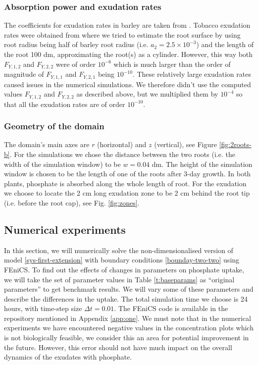 \documentclass[11pt]{article}
\numberwithin{equation}{section}
\begin{document}
\subsubsection{Absorption power and exudation rates}
The coefficients for exudation rates in barley are taken from \cite{Ruiz-2020}. Tobacco exudation rates were obtained from \cite{giles_george} where we tried to estimate the root surface by using root radius being half of barley root radius (i.e. $a_2 = 2.5 \times 10^{-3}$) and the length of the root 100 \si{dm}, approximating the root(s) as a cylinder. However, this way both $F_{Y,1,2}$ and $F_{Y,2,2}$ were of order $10^{-6}$ which is much larger than the order of magnitude of $F_{Y,1,1}$ and $F_{Y,2,1}$ being $10^{-10}$. These relatively large exudation rates caused issues in the numerical simulations. We therefore didn't use the computed values $F_{Y,1,2}$ and $F_{Y,2,2}$ as described above, but we multiplied them by $10^{-4}$ so that all the exudation rates are of order $10^{-10}$.

\subsubsection{Geometry of the domain}
The domain's main axes are $r$ (horizontal) and $z$ (vertical), see Figure \ref{fig:2roots-b}. For the simulations we chose the distance between the two roots (i.e. the width of the simulation window) to be $w = 0.04$ \si{dm}. The height of the simulation window is chosen to be the length of one of the roots after 3-day growth. In both plants, phosphate is absorbed along the whole length of root. For the exudation we choose to locate the 2 \si{cm} long exudation zone to be 2 \si{cm} behind the root tip (i.e. before the root cap), see Fig. \ref{fig:zones}.

\subsection{Numerical experiments}
\label{sec:extended_exper}
In this section, we will numerically solve the non-dimensionalised version of model \eqref{sys-first-extension} with boundary conditions \eqref{bounday-two-two} using FEniCS. To find out the effects of changes in parameters on phosphate uptake, we will take the set of parameter values in Table \ref{t:baseparams} as ``original parameters'' to get benchmark results. We will vary some of these parameters and describe the differences in the uptake. The total simulation time we choose is 24 hours, with time-step size $\Delta t = 0.01$. The FEniCS code is available in the repository mentioned in Appendix \ref{app:one}. We must note that in the numerical experiments we have encountered negative values in the concentration plots which is not biologically feasible, we consider this an area for potential improvement in the future. However, this error should not have much impact on the overall dynamics of the exudates with phosphate.
\end{document}
